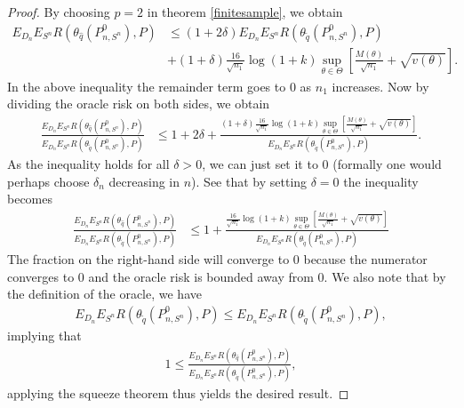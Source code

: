 \documentclass[11pt, a4paper]{article}
\theoremstyle{definition}
\theoremstyle{remark}
\newcommand{\q}{q}
\newcommand{\btheta}{\theta}
\newcommand{\Sn}{S^n}
\begin{document}
\begin{proof}
    By choosing $ p = 2 $ in theorem \ref{finitesample}, we obtain
    \begin{align*}
        E_{D_n} E_{\Sn} R(\btheta_{\hat{\q}}(P_{n, \Sn}^{0}), P) &\leq(1 + 2 \delta) E_{D_n} E_{\Sn} R(\btheta_{ \tilde{\q}}(P_{n,\Sn}^{0}), P)\\
                                                                 &+(1 + \delta) \frac{16}{\sqrt{n_1}} \log (1 +k) \sup_{\btheta \in \Theta} \left[ \frac{M(\theta)}{\sqrt{n_1}} + \sqrt{v(\theta)} \right].
    \end{align*}
    In the above inequality the remainder term goes to $ 0 $ as $ n_1 $ increases. Now by dividing the oracle risk on both sides, we obtain
    \begin{align*}
        \frac{E_{D_n} E_{\Sn} R(\btheta_{\hat{\q}}(P_{n, \Sn}^{0}), P)}{E_{D_n} E_{\Sn} R(\btheta_{ \tilde{\q}}(P_{n,\Sn}^{0}), P)} 
        &\leq 
        1 + 2 \delta 
        + 
        \frac{(1 + \delta)\frac{16}{\sqrt{n_1}} \log (1 +k) \sup_{\btheta \in \Theta} \left[ \frac{M(\theta)}{\sqrt{n_1}} + \sqrt{v(\theta)} \right]}{E_{D_n} E_{\Sn} R(\btheta_{ \tilde{\q}}(P_{n,\Sn}^{0}), P)} .
    \end{align*}
    As the inequality holds for all $ \delta > 0 $, we can just set it to 0 (formally one would perhaps choose $ \delta_n $ decreasing in $ n $). See that by setting $ \delta = 0 $ the inequality becomes 
    \begin{align*}
        \frac{E_{D_n} E_{\Sn} R(\btheta_{\hat{\q}}(P_{n, \Sn}^{0}), P)}{E_{D_n} E_{\Sn} R(\btheta_{ \tilde{\q}}(P_{n,\Sn}^{0}), P)} 
        &\leq
        1 
        + 
        \frac{\frac{16}{\sqrt{n_1}} \log (1 +k) \sup_{\btheta \in \Theta} \left[ \frac{M(\theta)}{\sqrt{n_1}} + \sqrt{v(\theta)} \right]}{E_{D_n} E_{\Sn} R(\btheta_{ \tilde{\q}}(P_{n,\Sn}^{0}), P)} 
    \end{align*}
    The fraction on the right-hand side will converge to $0$ because the numerator converges to $ 0 $ and the oracle risk is bounded away from $ 0 $. We also note that by the definition of the oracle, we have 
    \begin{align*}
        E_{D_n} E_{\Sn} R(\btheta_{ \tilde{\q}}(P_{n,\Sn}^{0}), P) \leq E_{D_n} E_{\Sn} R(\btheta_{ \tilde{\q}}(P_{n,\Sn}^{0}), P),
    \end{align*}
    implying that 
        \begin{align*}
            1 \leq \frac{E_{D_n} E_{\Sn} R(\btheta_{\hat{\q}}(P_{n, \Sn}^{0}), P)}{E_{D_n} E_{\Sn} R(\btheta_{ \tilde{\q}}(P_{n,\Sn}^{0}), P)}, 
    \end{align*}
    applying the squeeze theorem thus yields the desired result.         
\end{proof}
\end{document}
